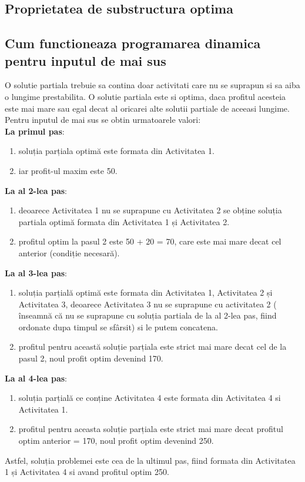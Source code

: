 \subsection{Proprietatea de substructura optima}
\subsection{Cum functioneaza programarea dinamica pentru inputul de mai sus}
O solutie partiala trebuie sa contina doar activitati care nu se suprapun si sa aiba o lungime prestabilita. O solutie partiala este si optima, daca profitul acesteia este mai mare sau egal decat al oricarei alte solutii partiale de aceeasi lungime.  \\

Pentru inputul de mai sus se obtin urmatoarele valori:\\
\textbf{La primul pas}:
\begin{enumerate}
    \item soluția parțiala optimă este formata din Activitatea 1.
    \item iar profit-ul maxim este 50. \\
\end{enumerate}
\textbf{La al 2-lea pas}:
\begin{enumerate}
    \item deoarece Activitatea 1 nu se suprapune cu Activitatea 2 se obține soluția partiala optimă formata din Activitatea 1 și Activitatea 2.
    \item profitul optim la pasul 2 este 50 + 20 = 70, care este mai mare decat cel anterior (condiție necesară).
\end{enumerate}
\textbf{La al 3-lea pas}:
\begin{enumerate}
    \item soluția parțială optimă este formata din Activitatea 1, Activitatea 2 și Activitatea 3, deoarece Activitatea 3 nu se suprapune cu activitatea 2 ( înseamnă că nu se suprapune cu soluția partiala de la al 2-lea pas, fiind ordonate dupa timpul se sfârsit) si le putem concatena.
    \item profitul pentru această soluție parțiala este strict mai mare decat cel de la pasul 2, noul profit optim devenind 170. \\
\end{enumerate}
\textbf{La al 4-lea pas}:
\begin{enumerate}
    \item soluția parțială ce conține Activitatea 4 este formata din Activitatea 4 si Activitatea 1.
    \item profitul pentru aceasta soluție parțiala este strict mai mare decat profitul optim anterior = 170, noul profit optim devenind 250.
\end{enumerate} 
Astfel, soluția problemei este cea de la ultimul pas, fiind formata din Activitatea 1 și Activitatea 4 si avand profitul optim 250. 

